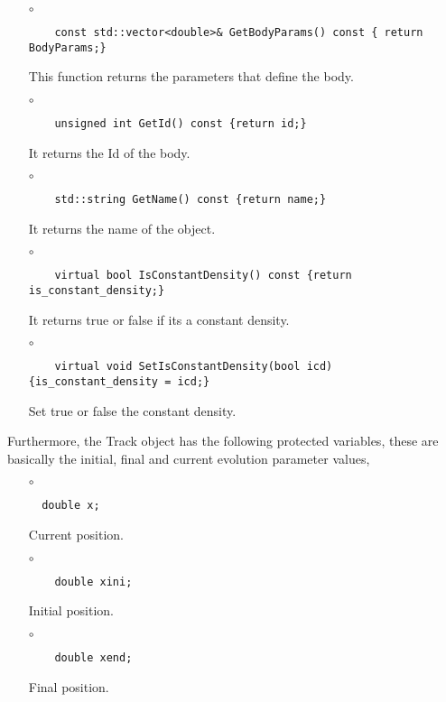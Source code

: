 \begin{itemize}
\item[$\circ$]  
  \begin{lstlisting}
    const std::vector<double>& GetBodyParams() const { return BodyParams;}
  \end{lstlisting}
  This function returns the parameters that define the body.

\item[$\circ$]  
  \begin{lstlisting}
    unsigned int GetId() const {return id;}
  \end{lstlisting}
  It returns the Id of the body.

\item[$\circ$]  
  \begin{lstlisting}
    std::string GetName() const {return name;}
  \end{lstlisting}
  It returns the name of the object.

\item[$\circ$]  
  \begin{lstlisting}
    virtual bool IsConstantDensity() const {return is_constant_density;}
  \end{lstlisting}
  It returns true or false if its a  constant density.

\item[$\circ$]  
  \begin{lstlisting}
    virtual void SetIsConstantDensity(bool icd) {is_constant_density = icd;}
  \end{lstlisting}
  Set true or false the constant density. 
\end{itemize}
Furthermore, the {\ttf Track} object has the following protected
variables, these are basically the initial, final and current
evolution parameter values,
%
%
\begin{itemize}
\item[$\circ$]  
  \begin{lstlisting}
  double x;
  \end{lstlisting}
  Current position.
\item[$\circ$]  
  \begin{lstlisting}
    double xini;
  \end{lstlisting}
  Initial position.
\item[$\circ$]  
  \begin{lstlisting}
    double xend;
  \end{lstlisting}
  Final position.
\end{itemize}
